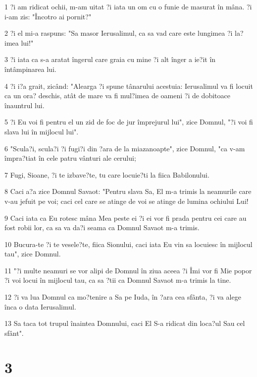 \par 1 ?i am ridicat ochii, m-am uitat ?i iata un om cu o funie de masurat în mâna. ?i i-am zis: "Încotro ai pornit?"
\par 2 ?i el mi-a raspuns: "Sa masor Ierusalimul, ca sa vad care este lungimea ?i la?imea lui!"
\par 3 ?i iata ca s-a aratat îngerul care graia cu mine ?i alt înger a ie?it în întâmpinarea lui.
\par 4 ?i i?a grait, zicând: "Alearga ?i spune tânarului acestuia: Ierusalimul va fi locuit ca un ora? deschis, atât de mare va fi mul?imea de oameni ?i de dobitoace înauntrul lui.
\par 5 ?i Eu voi fi pentru el un zid de foc de jur împrejurul lui", zice Domnul, "?i voi fi slava lui în mijlocul lui".
\par 6 "Scula?i, scula?i ?i fugi?i din ?ara de la miazanoapte", zice Domnul, "ca v-am împra?tiat în cele patru vânturi ale cerului;
\par 7 Fugi, Sioane, ?i te izbave?te, tu care locuie?ti la fiica Babilonului.
\par 8 Caci a?a zice Domnul Savaot: "Pentru slava Sa, El m-a trimis la neamurile care v-au jefuit pe voi; caci cel care se atinge de voi se atinge de lumina ochiului Lui!
\par 9 Caci iata ca Eu rotesc mâna Mea peste ei ?i ei vor fi prada pentru cei care au fost robii lor, ca sa va da?i seama ca Domnul Savaot m-a trimis.
\par 10 Bucura-te ?i te vesele?te, fiica Sionului, caci iata Eu vin sa locuiesc în mijlocul tau", zice Domnul.
\par 11 "?i multe neamuri se vor alipi de Domnul în ziua aceea ?i Îmi vor fi Mie popor ?i voi locui în mijlocul tau, ca sa ?tii ca Domnul Savaot m-a trimis la tine.
\par 12 ?i va lua Domnul ca mo?tenire a Sa pe Iuda, în ?ara cea sfânta, ?i va alege înca o data Ierusalimul.
\par 13 Sa taca tot trupul înaintea Domnului, caci El S-a ridicat din loca?ul Sau cel sfânt".

\chapter{3}

